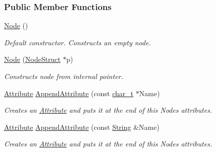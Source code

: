 \subsubsection*{Public Member Functions}
\begin{DoxyCompactItemize}
\item 
\hypertarget{classMezzanine_1_1xml_1_1Node_a8259956725a475e9fd6984d58aef25bb}{
\hyperlink{classMezzanine_1_1xml_1_1Node_a8259956725a475e9fd6984d58aef25bb}{Node} ()}
\label{classMezzanine_1_1xml_1_1Node_a8259956725a475e9fd6984d58aef25bb}

\begin{DoxyCompactList}\small\item\em Default constructor. Constructs an empty node. \item\end{DoxyCompactList}\item 
\hyperlink{classMezzanine_1_1xml_1_1Node_ae03ada122b5289487cd9b7fec38ce326}{Node} (\hyperlink{classNodeStruct}{NodeStruct} $\ast$p)
\begin{DoxyCompactList}\small\item\em Constructs node from internal pointer. \item\end{DoxyCompactList}\item 
\hyperlink{classMezzanine_1_1xml_1_1Attribute}{Attribute} \hyperlink{classMezzanine_1_1xml_1_1Node_a1f41ecc96128f478bb8f234022cc0b3c}{AppendAttribute} (const \hyperlink{namespaceMezzanine_1_1xml_a29b8a47c179e9895c4e9e66c45d1dbbc}{char\_\-t} $\ast$Name)
\begin{DoxyCompactList}\small\item\em Creates an \hyperlink{classMezzanine_1_1xml_1_1Attribute}{Attribute} and puts it at the end of this Nodes attributes. \item\end{DoxyCompactList}\item 
\hyperlink{classMezzanine_1_1xml_1_1Attribute}{Attribute} \hyperlink{classMezzanine_1_1xml_1_1Node_ae176f43c75b8bad16460fcb61925927d}{AppendAttribute} (const \hyperlink{namespaceMezzanine_1_1xml_a3ddf35656ecc38b6fa1d0364d9ad3b2c}{String} \&Name)
\begin{DoxyCompactList}\small\item\em Creates an \hyperlink{classMezzanine_1_1xml_1_1Attribute}{Attribute} and puts it at the end of this Nodes attributes. \item\end{DoxyCompactList}\item 

\end{DoxyCompactItemize}
